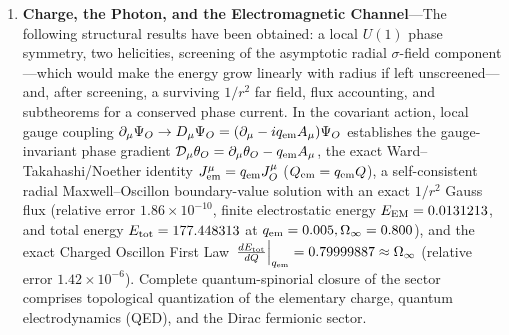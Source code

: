 \documentclass[11pt,a4paper]{article}
\begin{document}
\begin{enumerate}[label=\arabic*.]
\item \textbf{Charge, the Photon, and the Electromagnetic Channel}---The following structural results have been obtained: a local $U(1)$ phase symmetry, two helicities, screening of the asymptotic radial $\sigma$-field component---which would make the energy grow linearly with radius if left unscreened---and, after screening, a surviving $1/r^2$ far field, flux accounting, and subtheorems for a conserved phase current. In the covariant action, local gauge coupling $\partial_\mu\Psi_O \to D_\mu\Psi_O = (\partial_\mu - i q_{\rm em}A_\mu)\Psi_O$ establishes the gauge-invariant phase gradient $\mathcal{D}_\mu\theta_O = \partial_\mu\theta_O - q_{\rm em}A_\mu$, the exact Ward--Takahashi/Noether identity $J_{\rm em}^\mu = q_{\rm em}J_O^\mu$ ($Q_{\rm em} = q_{\rm em}Q$), a self-consistent radial Maxwell--Oscillon boundary-value solution with an exact $1/r^2$ Gauss flux (relative error $1.86\times 10^{-10}$, finite electrostatic energy $E_{\rm EM} = 0.0131213$, and total energy $E_{\rm tot} = 177.448313$ at $q_{\rm em}=0.005, \Omega_\infty=0.800$), and the exact Charged Oscillon First Law $\left.\frac{dE_{\rm tot}}{dQ}\right|_{q_{\rm em}} = 0.79999887 \approx \Omega_\infty$ (relative error $1.42\times 10^{-6}$). Complete quantum-spinorial closure of the sector comprises topological quantization of the elementary charge, quantum electrodynamics (QED), and the Dirac fermionic sector.


\end{enumerate}
\end{document}
